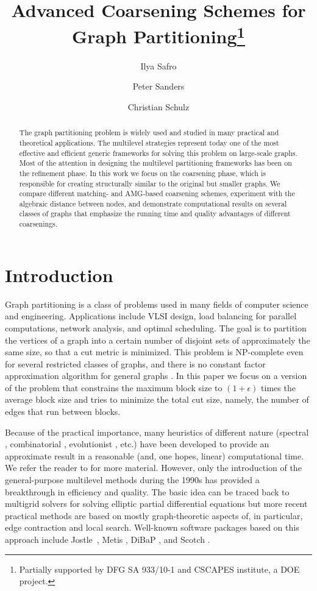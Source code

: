 \documentclass{llncs}
\title{\Large Advanced Coarsening Schemes for Graph Partitioning\thanks{Partially supported by DFG SA 933/10-1 and CSCAPES institute, a DOE project.}}
\author{
Ilya Safro\inst{1}
\and Peter Sanders\inst{2}
\and Christian Schulz \inst{2}
}
\institute{ Mathematics and Computer Science Division, Argonne National Laboratory\\ \email{safro@mcs.anl.gov}
\and Karlsruhe Institute of Technology, Institute for Theoretical Informatics, Algorithmics II\\
\email{sanders@kit.edu,  christian.schulz@kit.edu} 
}
\date{}
\begin{document}
\maketitle
\begin{abstract}
The graph partitioning problem is widely used and studied in many practical and theoretical applications. 
The multilevel strategies represent today one of the most effective and efficient generic frameworks for solving this problem on large-scale graphs. 
Most of the attention in designing the multilevel partitioning frameworks has been on the refinement  phase. 
In this work we focus on the coarsening phase, which is responsible for creating structurally 
similar to the original but smaller graphs. 
We compare different matching- and AMG-based coarsening schemes, experiment with the algebraic distance between nodes, and demonstrate computational results on several classes of graphs that emphasize the running time and quality advantages of different coarsenings.
\end{abstract}
\section{Introduction}
\thispagestyle{empty}
Graph partitioning is a class of problems used in many fields of computer
science and engineering. Applications include VLSI design, load balancing for parallel computations,  network analysis, and optimal scheduling. The goal is to partition the vertices of a graph into a certain number of disjoint sets
of approximately the same size, so that a cut metric is minimized.
This problem is NP-complete even for several restricted classes of graphs, and there is no constant factor approximation algorithm for general graphs \cite{journals/ipl/BuiJ92}. 
In this paper we focus on a version of the problem that constrains the
maximum block size to $(1+\epsilon)$ times the average block size and tries to
minimize the total cut size, namely, the number of edges that run between blocks.


Because of the  practical importance, many heuristics of different nature (spectral \cite{pothen-part}, combinatorial \cite{fiduccia1982lth}, evolutionist \cite{buiMoon96,kaffpaE}, etc.) have
been developed to provide an approximate result in a reasonable (and, one hopes,
linear) computational time. We refer the reader to  \cite{fjallstrom1998agp,SchKarKum00,Walshaw07} for more material.
However, only the introduction of the general-purpose multilevel methods during the 1990s has provided a breakthrough in efficiency and quality. 
The basic idea can be traced back to multigrid solvers for solving elliptic partial differential equations \cite{mgbooktrott} but more recent practical methods are based on mostly graph-theoretic aspects of, in particular, edge contraction and local search.  Well-known software packages based on this approach include Jostle~\cite{Walshaw07}, Metis \cite{SchKarKum00}, DiBaP \cite{meyerhenke2008ndb}, and Scotch \cite{Scotch}.  
\end{document}
